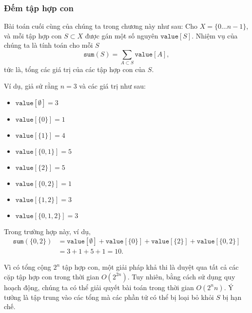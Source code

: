 \subsubsection{Đếm tập hợp con}

Bài toán cuối cùng của chúng ta trong chương này như sau:
Cho $X=\{0 \ldots n-1\}$, và mỗi tập hợp con $S \subset X$
được gán một số nguyên $\texttt{value}[S]$.
Nhiệm vụ của chúng ta là tính toán cho mỗi $S$
\[\texttt{sum}(S) = \sum_{A \subset S} \texttt{value}[A],\]
tức là, tổng các giá trị của các tập hợp con của $S$.

Ví dụ, giả sử rằng $n=3$ và các giá trị như sau:
\begin{multicols}{2}
\begin{itemize}
\item $\texttt{value}[\emptyset] = 3$
\item $\texttt{value}[\{0\}] = 1$
\item $\texttt{value}[\{1\}] = 4$
\item $\texttt{value}[\{0,1\}] = 5$
\item $\texttt{value}[\{2\}] = 5$
\item $\texttt{value}[\{0,2\}] = 1$
\item $\texttt{value}[\{1,2\}] = 3$
\item $\texttt{value}[\{0,1,2\}] = 3$
\end{itemize}
\end{multicols}
Trong trường hợp này, ví dụ,
\begin{equation*}
\begin{split}
\texttt{sum}(\{0,2\}) &= \texttt{value}[\emptyset]+\texttt{value}[\{0\}]+\texttt{value}[\{2\}]+\texttt{value}[\{0,2\}] \\ 
                      &= 3 + 1 + 5 + 1 = 10.
\end{split}
\end{equation*}

Vì có tổng cộng $2^n$ tập hợp con,
một giải pháp khả thi là duyệt qua tất cả
các cặp tập hợp con trong thời gian $O(2^{2n})$.
Tuy nhiên, bằng cách sử dụng quy hoạch động, chúng ta
có thể giải quyết bài toán trong thời gian $O(2^n n)$.
Ý tưởng là tập trung vào các tổng mà các
phần tử có thể bị loại bỏ khỏi $S$ bị hạn chế.

